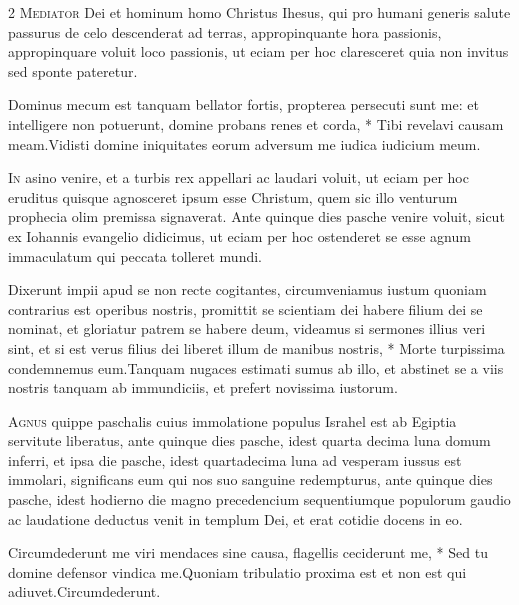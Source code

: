 \begin{multicols*}{2}
\lettrine[lines=2]{\zallmancaps \color{Red} M}{ediator} Dei et hominum homo Christus Ihesus, qui pro humani generis salute passurus de celo descenderat ad terras, appropinquante hora passionis, appropinquare voluit loco passionis, ut eciam per hoc claresceret quia non invitus sed sponte pateretur.
\begin{responsory}
{Dominus mecum est tanquam bellator fortis, propterea persecuti sunt me: et intelligere non potuerunt, domine probans renes et corda, * Tibi revelavi causam meam.}{Vidisti domine iniquitates eorum adversum me iudica iudicium meum.}
\end{responsory}%
\lettrine[lines=2]{\zallmancaps \color{Blue} I}{n} asino venire, et a turbis rex appellari ac laudari voluit, ut eciam per hoc eruditus quisque agnosceret ipsum esse Christum, quem sic illo venturum prophecia olim premissa signaverat. Ante quinque dies pasche venire voluit, sicut ex Iohannis evangelio didicimus, ut eciam per hoc ostenderet se esse agnum immaculatum qui peccata tolleret mundi.
\begin{responsory}
{Dixerunt impii apud se non recte cogitantes, circumveniamus iustum quoniam contrarius est operibus nostris, promittit se scientiam dei habere filium dei se nominat, et gloriatur patrem se habere deum, videamus si sermones illius veri sint, et si est verus filius dei liberet illum de manibus nostris, * Morte turpissima condemnemus eum.}{Tanquam nugaces estimati sumus ab illo, et abstinet se a viis nostris tanquam ab immundiciis, et prefert novissima iustorum.}
\end{responsory}%
\lettrine[lines=2]{\zallmancaps \color{Red} A}{gnus} quippe paschalis cuius immolatione populus Israhel est ab Egiptia servitute liberatus, ante quinque dies pasche, idest quarta decima luna domum inferri, et ipsa die pasche, idest quartadecima luna ad vesperam iussus est immolari, significans eum qui nos suo sanguine redempturus, ante quinque dies pasche, idest hodierno die magno precedencium sequentiumque populorum gaudio ac laudatione deductus venit in templum Dei, et erat cotidie docens in eo.
\begin{responsory}
{Circumdederunt me viri mendaces sine causa, flagellis ceciderunt me, * Sed tu domine defensor vindica me.}{Quoniam tribulatio proxima est et non est qui adiuvet.}Circumdederunt.

\end{responsory}
\end{multicols*}
